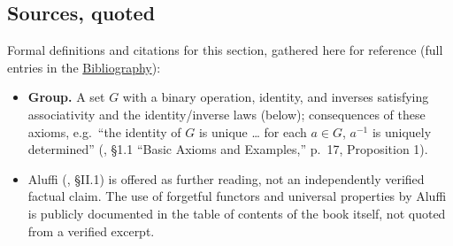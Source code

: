 \subsection{Sources, quoted}\label{sec:07-groups:01-definition:2}

Formal definitions and citations for this section, gathered here for reference (full entries in the \hyperref[sec:root:bibliography:1]{Bibliography}):

\begin{itemize}
\tightlist
\item
  \textbf{Group.} A set \(G\) with a binary operation, identity, and inverses satisfying associativity and the identity/inverse laws (below); consequences of these axioms, e.g.~``the identity of \(G\) is unique \ldots{} for each \(a \in G\), \(a^{-1}\) is uniquely determined'' (\cite{DummitFoote2003}, §1.1 ``Basic Axioms and Examples,'' p.~17, Proposition 1).
\item
  Aluffi (\cite{Aluffi2009}, §II.1) is offered as further reading, not an independently verified factual claim. The use of forgetful functors and universal properties by Aluffi is publicly documented in the table of contents of the book itself, not quoted from a verified excerpt.
\end{itemize}
